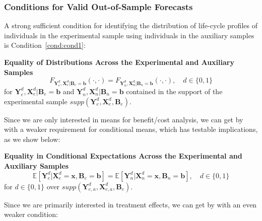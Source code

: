 \subsubsection{Conditions for Valid Out-of-Sample Forecasts}

A strong sufficient condition for identifying the distribution of life-cycle profiles of individuals in the experimental sample using individuals in the auxiliary samples is Condition~\ref{cond:cond1}:

\onehalfspacing
\begin{condition} \textbf{Equality of Distributions Across the Experimental and Auxiliary Samples \label{cond:cond1}}
\begin{equation}
F_{\bm{Y}_e^d, \bm{X}_e^d | \bm{B}_e = \bm{b}} \left( \cdot, \cdot \right) = F_{\bm{Y}_n^d, \bm{X}_n^d | \bm{B}_n = \bm{b}} \left( \cdot, \cdot \right), \quad d \in \{0,1\}
\end{equation}
\noindent for $\bm{Y}_e^d, \bm{X}^d_e | \bm{B}_e = \bm{b}$ and $\bm{Y}_n^d, \bm{X}^d_n | \bm{B}_n = \bm{b}$ contained in the support of the experimental sample $supp\left(\bm{Y}^d_{e}, \bm{X}^d_{e}, \bm{B}_{e} \right)$.
\end{condition}
\doublespacing

Since we are only interested in means for benefit/cost analysis, we can get by with a weaker requirement for conditional means, which has testable implications, as we show below:

\onehalfspacing
\begin{condition} \textbf{Equality in Conditional Expectations Across the Experimental and Auxiliary Samples \label{cond:cond2}}
\begin{equation}
\mathbb{E} \left[ \bm{Y}_e^d |  \bm{X}_e^d = \bm{x}, \bm{B}_e = \bm{b} \right] = \mathbb{E} \left[ \bm{Y}_n^d |  \bm{X}_n^d = \bm{x}, \bm{B}_n = \bm{b} \right], \quad d \in \{0,1\}
\end{equation}
for $d \in \{0, 1 \}$ over $supp\left(\bm{Y}^d_{e,a}, \bm{X}^d_{e,a}, \bm{B}_e\right)$.
\end{condition}
\doublespacing

Since we are primarily interested in treatment effects, we can get by with an even weaker condition:

